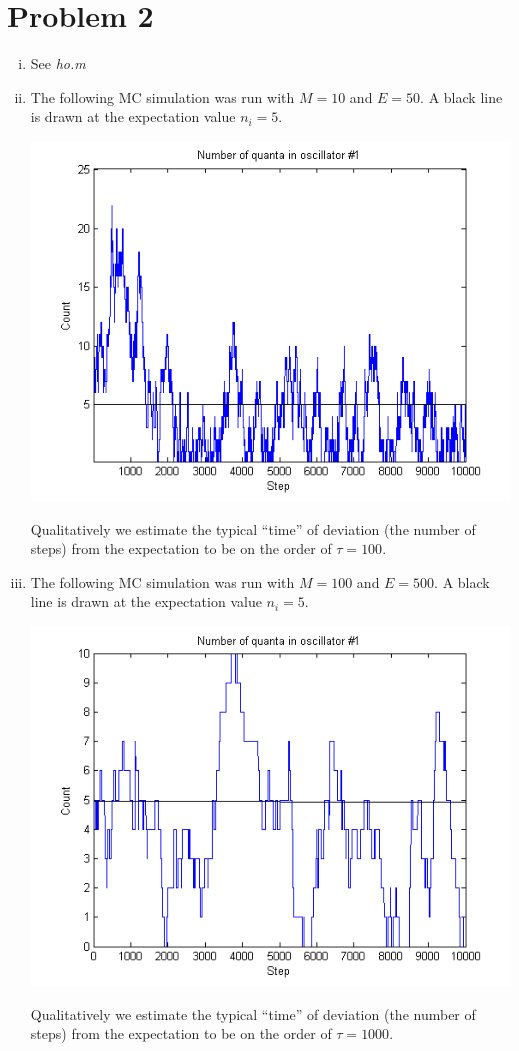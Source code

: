 \documentclass{article}
\begin{document}
\section*{Problem 2}
\begin{enumerate}[i.]
  \item See \textit{ho.m}
  \item The following MC simulation was run with $M=10$ and $E=50$. A black line is drawn at the expectation value $n_i=5$.
    \begin{center}
      \includegraphics[scale=0.5]{prob2part2}
    \end{center}
    Qualitatively we estimate the typical ``time'' of deviation (the number of steps) from the expectation to be on the order of $\tau=100$.
  \item The following MC simulation was run with $M=100$ and $E=500$. A black line is drawn at the expectation value $n_i=5$.
    \begin{center}
      \includegraphics[scale=0.5]{prob2part3}
    \end{center}
    Qualitatively we estimate the typical ``time'' of deviation (the number of steps) from the expectation to be on the order of $\tau=1000$.


\end{enumerate}
\end{document}

